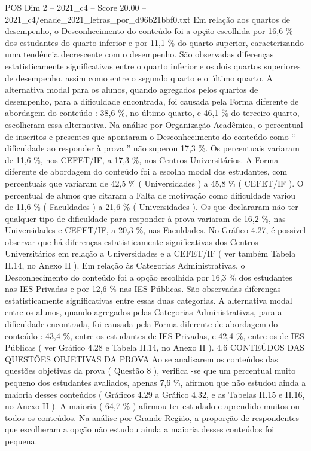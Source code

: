 \begin{textsample}{POS Dim 2 – 2021\_c4 – Score 20.00 – 2021\_c4/enade\_2021\_letras\_por\_d96b21bbf0.txt}
Em relação aos quartos de desempenho, o Desconhecimento do conteúdo foi a opção escolhida por 16,6 \% dos estudantes do quarto inferior e por 11,1 \% do quarto superior, caracterizando uma tendência decrescente com o desempenho.
São observadas diferenças estatisticamente significativas entre o quarto inferior e os dois quartos superiores de desempenho, assim como entre o segundo quarto e o último quarto.
A alternativa modal para os alunos, quando agregados pelos quartos de desempenho, para a dificuldade encontrada, foi causada pela Forma diferente de abordagem do conteúdo : 38,6 \%, no último quarto, e 46,1 \% do terceiro quarto, escolheram essa alternativa.
Na análise por Organização Acadêmica, o percentual de inscritos e presentes que apontaram o Desconhecimento do conteúdo como “ dificuldade ao responder à prova ” não superou 17,3 \%.
Os percentuais variaram de 11,6 \%, nos CEFET/IF, a 17,3 \%, nos Centros Universitários.
A Forma diferente de abordagem do conteúdo foi a escolha modal dos estudantes, com percentuais que variaram de 42,5 \% ( Universidades ) a 45,8 \% ( CEFET/IF ).
O percentual de alunos que citaram a Falta de motivação como dificuldade variou de 11,6 \% ( Faculdades ) a 21,6 \% ( Universidades ).
Os que declararam não ter qualquer tipo de dificuldade para responder à prova variaram de 16,2 \%, nas Universidades e CEFET/IF, a 20,3 \%, nas Faculdades.
No Gráfico 4.27, é possível observar que há diferenças estatisticamente significativas dos Centros Universitários em relação a Universidades e a CEFET/IF ( ver também Tabela II.14, no Anexo II ).
Em relação às Categorias Administrativas, o Desconhecimento do conteúdo foi a opção escolhida por 16,3 \% dos estudantes nas IES Privadas e por 12,6 \% nas IES Públicas.
São observadas diferenças estatisticamente significativas entre essas duas categorias.
A alternativa modal entre os alunos, quando agregados pelas Categorias Administrativas, para a dificuldade encontrada, foi causada pela Forma diferente de abordagem do conteúdo : 43,4 \%, entre os estudantes de IES Privadas, e 42,4 \%, entre os de IES Públicas ( ver Gráfico 4.28 e Tabela II.14, no Anexo II ). 4.6 CONTEÚDOS DAS QUESTÕES OBJETIVAS DA PROVA Ao se analisarem os conteúdos das questões objetivas da prova ( Questão 8 ), verifica -se que um percentual muito pequeno dos estudantes avaliados, apenas 7,6 \%, afirmou que não estudou ainda a maioria desses conteúdos ( Gráficos 4.29 a Gráfico 4.32, e as Tabelas II.15 e II.16, no Anexo II ).
A maioria ( 64,7 \% ) afirmou ter estudado e aprendido muitos ou todos os conteúdos.
Na análise por Grande Região, a proporção de respondentes que escolheram a opção não estudou ainda a maioria desses conteúdos foi pequena.

\end{textsample}

